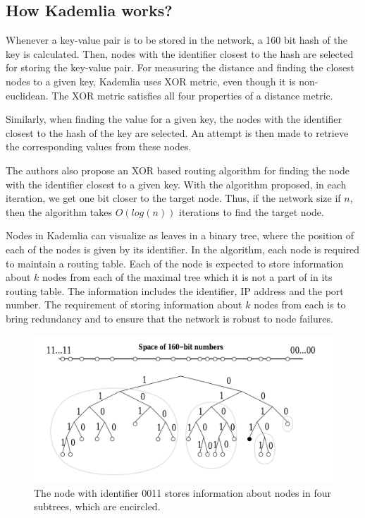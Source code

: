 \subsection{How Kademlia works?}

Whenever a key-value pair is to be stored in the network, a 160 bit hash of the
key is calculated. Then, nodes with the identifier closest to the hash are
selected for storing the key-value pair. For measuring the distance and finding
the closest nodes to a given key, Kademlia uses XOR metric, even though it is
non-euclidean. The XOR metric satisfies all four properties of a distance
metric.
\cite{MetricSpace2022}

Similarly, when finding the value for a given key, the nodes with the identifier
closest to the hash of the key are selected. An attempt is then made to retrieve
the corresponding values from these nodes.

The authors also propose an XOR based routing algorithm for finding the node
with the identifier closest to a given key. With the algorithm proposed, in each
iteration, we get one bit closer to the target node. Thus, if the network size
if $n$, then the algorithm takes $O(log(n))$ iterations to find the target node.

Nodes in Kademlia can visualize as leaves in a binary tree, where the position of
each of the nodes is given by its identifier. In the algorithm, each node is
required to maintain a routing table. Each of the node is expected to store
information about $k$ nodes from each of the maximal tree which it is not
a part of in its routing table. The information includes the identifier, IP address
and the port number. The requirement of storing information about $k$ nodes from
each is to bring redundancy and to ensure that the network is robust to node
failures.

\begin{figure}[h]
      \centering
      \includegraphics[width=1.0\textwidth]{kademlia.png}
      \caption[Kademlia]{The node with identifier 0011 stores information about
            nodes in four subtrees, which are encircled.
            \cite{petarmaymounkovKademliaPeertoPeerInformation2002}}
\end{figure}

